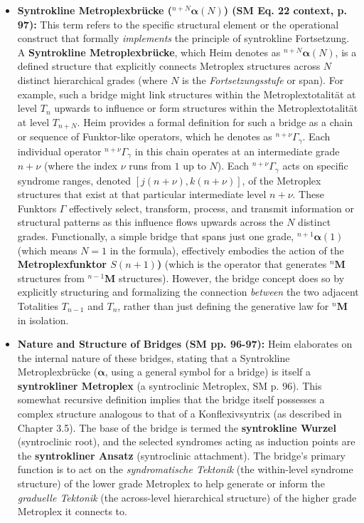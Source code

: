 \documentclass[12pt]{article}
\newcommand{\metroplex}[1]{{}^{#1}\mathbf{M}}
\newcommand{\metroplextotalitaet}[1]{T_{#1}}
\newcommand{\metroplexfunktor}{S}
\newcommand{\syntroklinebruecke}[1]{{}^{#1}\bm{\alpha}}
\newcommand{\metroplextotalitaetarg}[1]{T_{#1}}
\begin{document}
\begin{itemize}
    \item \textbf{Syntrokline Metroplexbrücke (\( \syntroklinebruecke{n+N}(N) \)) (SM Eq. 22 context, p. 97):}
    This term refers to the specific structural element or the operational construct that formally \textit{implements} the principle of syntrokline Fortsetzung. A \textbf{Syntrokline Metroplexbrücke}, which Heim denotes as \( \syntroklinebruecke{n+N}(N) \), is a defined structure that explicitly connects Metroplex structures across \( N \) distinct hierarchical grades (where \( N \) is the \textit{Fortsetzungsstufe} or span). For example, such a bridge might link structures within the Metroplextotalität at level \( \metroplextotalitaet{n} \) upwards to influence or form structures within the Metroplextotalität at level \( \metroplextotalitaet{n+N} \).
    Heim provides a formal definition for such a bridge as a chain or sequence of Funktor-like operators, which he denotes as \( {}^{n+\nu}\Gamma_\gamma \). Each individual operator \( {}^{n+\nu}\Gamma_\gamma \) in this chain operates at an intermediate grade \( n+\nu \) (where the index \( \nu \) runs from \( 1 \) up to \( N \)). Each \( {}^{n+\nu}\Gamma_\gamma \) acts on specific syndrome ranges, denoted \( [j(n+\nu), k(n+\nu)] \), of the Metroplex structures that exist at that particular intermediate level \( n+\nu \). These Funktors \( \Gamma \) effectively select, transform, process, and transmit information or structural patterns as this influence flows upwards across the \( N \) distinct grades.
    Functionally, a simple bridge that spans just one grade, \( \syntroklinebruecke{n+1}(1) \) (which means \( N=1 \) in the formula), effectively embodies the action of the \textbf{Metroplexfunktor \( \metroplexfunktor(n+1) \))} (which is the operator that generates \( \metroplex{n} \) structures from \( \metroplex{n-1} \) structures). However, the bridge concept does so by explicitly structuring and formalizing the connection \textit{between} the two adjacent Totalities \( \metroplextotalitaetarg{n-1} \) and \( \metroplextotalitaetarg{n} \), rather than just defining the generative law for \( \metroplex{n} \) in isolation.

    \item \textbf{Nature and Structure of Bridges (SM pp. 96-97):}
    Heim elaborates on the internal nature of these bridges, stating that a Syntrokline Metroplexbrücke (\( \bm{\alpha} \), using a general symbol for a bridge) is itself a \textbf{syntrokliner Metroplex} (a syntroclinic Metroplex, SM p. 96). This somewhat recursive definition implies that the bridge itself possesses a complex structure analogous to that of a Konflexivsyntrix (as described in Chapter 3.5). The base of the bridge is termed the \textbf{syntrokline Wurzel} (syntroclinic root), and the selected syndromes acting as induction points are the \textbf{syntrokliner Ansatz} (syntroclinic attachment). The bridge's primary function is to act on the \textit{syndromatische Tektonik} (the within-level syndrome structure) of the lower grade Metroplex to help generate or inform the \textit{graduelle Tektonik} (the across-level hierarchical structure) of the higher grade Metroplex it connects to.


\end{itemize}
\end{document}
